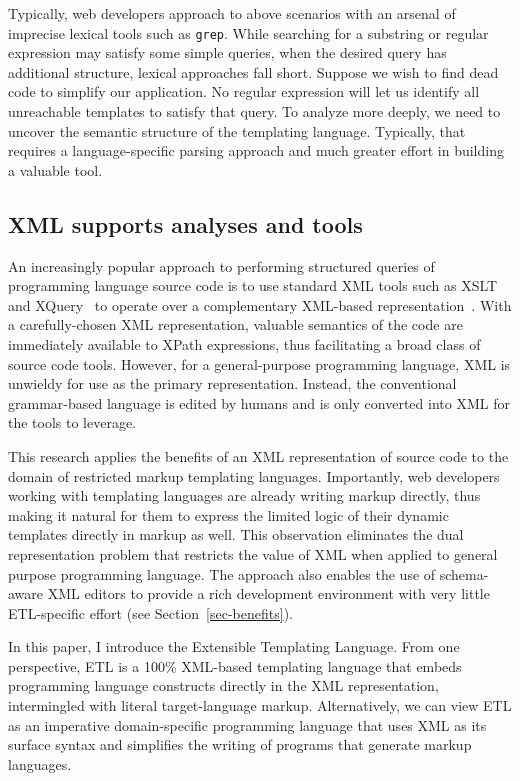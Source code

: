\documentclass{www2003-submission}
\newcommand{\smtexttt}[1]{{\small\texttt{#1}}}
\newcommand{\secref}[1]{Section~\ref{sec-#1}}
\begin{document}
Typically, web developers approach to above scenarios with an arsenal
of imprecise lexical tools such as \smtexttt{grep}.  While searching
for a substring or regular expression may satisfy some simple queries,
when the desired query has additional structure, lexical approaches
fall short.  Suppose we wish to find dead code to simplify our
application. No regular expression will let us identify all
unreachable templates to satisfy that query.  To analyze more deeply,
we need to uncover the semantic structure of the templating language.
Typically, that requires a language-specific parsing approach and much
greater effort in building a valuable tool.

\subsection{XML supports analyses and tools}

An increasingly popular approach to performing structured queries of
programming language source code is to use standard XML tools such as
XSLT~\cite{XSLT} and XQuery~\cite{XQuery} to operate over a
complementary XML-based representation~\cite{Badros-www9,others}.
With a carefully-chosen XML representation, valuable semantics of the
code are immediately available to XPath expressions, thus facilitating
a broad class of source code tools.  However, for a general-purpose
programming language, XML is unwieldy for use as the primary
representation.  Instead, the conventional grammar-based language is
edited by humans and is only converted into XML for the tools to
leverage.

This research applies the benefits of an XML representation of source
code to the domain of restricted markup templating languages.
Importantly, web developers working with templating languages are
already writing markup directly, thus making it natural for them to
express the limited logic of their dynamic templates directly in
markup as well.  This observation eliminates the dual representation
problem that restricts the value of XML when applied to general
purpose programming language.  The approach also enables the use of
schema-aware XML editors to provide a rich development environment
with very little ETL-specific effort (see \secref{benefits}).

In this paper, I introduce the Extensible Templating Language.  From
one perspective, ETL is a 100\% XML-based templating language that
embeds programming language constructs directly in the XML
representation, intermingled with literal target-language markup.
Alternatively, we can view ETL as an imperative domain-specific
programming language that uses XML as its surface syntax and
simplifies the writing of programs that generate markup languages.
\end{document}
